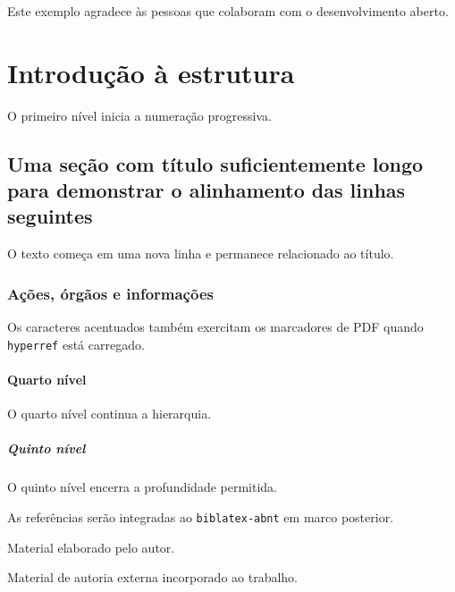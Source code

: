 \documentclass{article}
\begin{document}

Este exemplo agradece às pessoas que colaboram com o desenvolvimento aberto.

\ABNTEXsumario

\section{Introdução à estrutura}

O primeiro nível inicia a numeração progressiva.

\subsection{Uma seção com título suficientemente longo para demonstrar o
alinhamento das linhas seguintes}

O texto começa em uma nova linha e permanece relacionado ao título.

\subsubsection{Ações, órgãos e informações}

Os caracteres acentuados também exercitam os marcadores de PDF quando
\texttt{hyperref} está carregado.

\paragraph{Quarto nível}

O quarto nível continua a hierarquia.

\subparagraph{Quinto nível}

O quinto nível encerra a profundidade permitida.


As referências serão integradas ao \texttt{biblatex-abnt} em marco posterior.


Material elaborado pelo autor.


Material de autoria externa incorporado ao trabalho.
\end{document}
